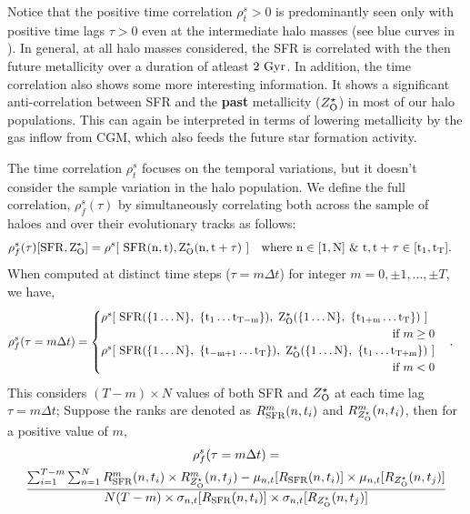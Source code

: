 Notice that the positive time correlation $\rho^s_t>0$ is predominantly seen only with positive time lags $\tau>0$ even at the intermediate halo masses (see blue curves in ). In general, at all halo masses considered, the SFR is correlated with the then future metallicity over a duration of atleast $2~\rm{Gyr}$. In addition, the time correlation also shows some more interesting information. It shows a significant anti-correlation between SFR and the \textbf{past} metallicity ($Z^{\star}_{\rm{O}}$) in most of our halo populations. This can again be interpreted in terms of lowering metallicity by the gas inflow from CGM, which also feeds the future star formation activity. 

The time correlation $\rho^s_t$ focuses on the temporal variations, but it doesn't consider the sample variation in the halo population. We define the full correlation, $\rho^s_f(\tau)$ by simultaneously correlating both across the sample of haloes and over their evolutionary tracks as follows:
\begin{align}
\rho^s_f (\tau)[\rm{SFR}, Z^{\star}_{\rm{O}}] &= \rho^s [ ~\rm{SFR}(n,t), Z^{\star}_{\rm{O}}(n,t+\tau) ~] \quad \text{where } n \in [1,N] ~\&~ t, t+\tau \in [t_1,t_T].
\end{align}
When computed at distinct time steps ($\tau = m \Delta t$) for integer $m=0, \pm1, \ldots, \pm T$, we have,
\begin{align}
\label{eq:def-full-corr}
\rho^s_f (\tau = m \Delta t) &= 
\begin{cases}
\rho^s [ ~\rm{SFR}(\{1 \ldots N\}, ~\{t_1 \ldots t_{T-m}\}), ~Z^{\star}_{\rm{O}}(\{1 \ldots N\}, ~\{t_{1+m} \ldots t_T\}) ~] \\
  \hfill \qquad \text{if } m \geq 0 \\
\rho^s [ ~\rm{SFR}(\{1 \ldots N\}, ~\{t_{-m+1} \ldots t_T\}), ~Z^{\star}_{\rm{O}}(\{1 \ldots N\}, ~\{t_1 \ldots t_{T+m}\}) ~] \\
 \hfill \qquad \text{if } m < 0
\end{cases}.
\end{align}
This considers $(T-m) \times N$ values of both SFR and $Z^{\star}_{\rm{O}}$ at each time lag $\tau = m \Delta t$; Suppose the ranks are denoted as $R^m_{\rm{SFR}}(n,t_i)$ and $R^m_{Z^{\star}_{\rm{O}}}(n,t_i)$, then for a positive value of $m$,
\begin{gather}
\rho^s_f (\tau = m \Delta t) = \nonumber\\
 \frac{ \sum_{i=1}^{T-m} \sum_{n=1}^{N} R^m_{\rm{SFR}}(n,t_i) \times  R^m_{Z^{\star}_{\rm{O}}}(n,t_j) - \mu_{n,t} [ R_{\rm{SFR}}(n,t_i) ]  \times \mu_{n,t} [R_{Z^{\star}_{\rm{O}}}(n,t_j)] }
{ N(T-m) \times \sigma_{n,t} [ R_{\rm{SFR}}(n,t_i) ]  \times \sigma_{n,t} [R_{Z^{\star}_{\rm{O}}}(n,t_j)] }
\end{gather}
